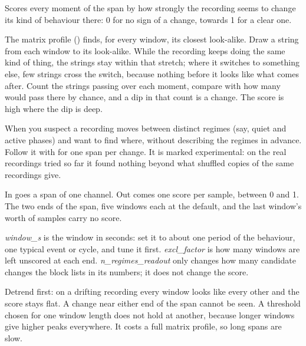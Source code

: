 Scores every moment of the span by how strongly the recording seems to change its kind of
behaviour there: 0 for no sign of a change, towards 1 for a clear one.

\begin{plainterms}
The matrix profile () finds, for every window, its closest
look-alike. Draw a string from each window to its look-alike. While the recording keeps doing the
same kind of thing, the strings stay within that stretch; where it switches to something else,
few strings cross the switch, because nothing before it looks like what comes after. Count the
strings passing over each moment, compare with how many would pass there by chance, and a dip in
that count is a change. The score is high where the dip is deep.
\end{plainterms}

When you suspect a recording moves between distinct regimes (say, quiet and active phases) and
want to find where, without describing the regimes in advance. Follow it with
 for one span per change. It is marked experimental: on the real
recordings tried so far it found nothing beyond what shuffled copies of the same recordings give.

In goes a span of one channel. Out comes one score per sample, between 0 and 1. The two ends of the
span, five windows each at the default, and the last window's worth of samples carry no score.

\emph{window\_s} is the window in seconds: set it to about one period of the behaviour, one typical
event or cycle, and tune it first. \emph{excl\_factor} is how many windows are left unscored at
each end. \emph{n\_regimes\_readout} only changes how many candidate changes the block lists in its
numbers; it does not change the score.

Detrend first: on a drifting recording every window looks like every other and the score stays
flat. A change near either end of the span cannot be seen. A threshold chosen for one window
length does not hold at another, because longer windows give higher peaks everywhere. It costs a
full matrix profile, so long spans are slow.

